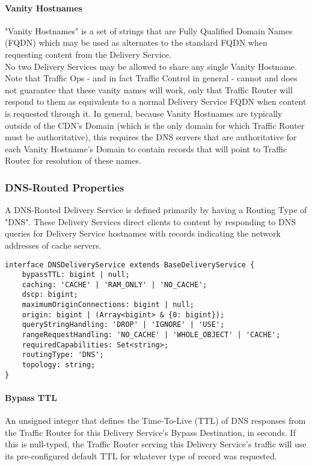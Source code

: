 \paragraph{Vanity Hostnames}
"Vanity Hostnames" is a set of strings that are Fully Qualified Domain Names
(FQDN) which may be used as alternates to the standard
 FQDN when requesting
content from the Delivery Service.\\
No two Delivery Services may be allowed to share any single Vanity Hostname.\\
Note that Traffic Ops - and in fact Traffic Control in general - cannot and
does not guarantee that these vanity names will work, only that Traffic Router
will respond to them as equivalents to a normal Delivery Service FQDN when
content is requested through it. In general, because Vanity Hostnames are
typically outside of the CDN's Domain (which is the only domain for which
Traffic Router must be authoritative), this requires the DNS servers that are
authoritative for each Vanity Hostname's Domain to contain records that will
point to Traffic Router for resolution of these names.

\subsubsection{DNS-Routed Properties}
A DNS-Routed Delivery Service is defined primarily by having a Routing Type of
"DNS". These Delivery Services direct clients to content by responding to DNS
queries for Delivery Service hostnames with records indicating the network
addresses of cache servers.

\begin{codelisting}
\begin{verbatim}
interface DNSDeliveryService extends BaseDeliveryService {
	bypassTTL: bigint | null;
	caching: 'CACHE' | 'RAM_ONLY' | 'NO_CACHE';
	dscp: bigint;
	maximumOriginConnections: bigint | null;
	origin: bigint | (Array<bigint> & {0: bigint});
	queryStringHandling: 'DROP' | 'IGNORE' | 'USE';
	rangeRequestHandling: 'NO_CACHE' | 'WHOLE_OBJECT' | 'CACHE';
	requiredCapabilities: Set<string>;
	routingType: 'DNS';
	topology: string;
}
\end{verbatim}
\end{codelisting}

\paragraph{Bypass TTL}
An unsigned integer that defines the Time-To-Live (TTL) of DNS responses from
the Traffic Router for this Delivery Service's Bypass Destination, in seconds.
If this is null-typed, the Traffic Router serving this Delivery Service's
traffic will use its pre-configured default TTL for whatever type of record was
requested.

